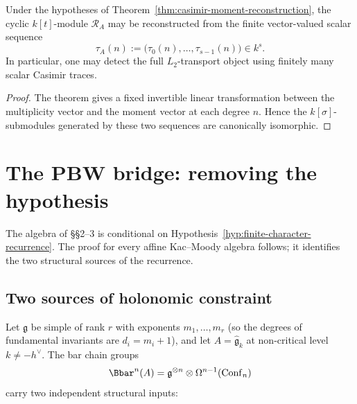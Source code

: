 \begin{corollary}
\ClaimStatusProvedHere
\label{cor:finite-scalar-probes}
Under the hypotheses of Theorem~\ref{thm:casimir-moment-reconstruction}, the cyclic \(k[t]\)-module \(\mathcal R_A\) may be reconstructed from the finite vector-valued scalar sequence
\[
\tau_A(n):=\bigl(\tau_0(n),\dots,\tau_{s-1}(n)\bigr)\in k^s.
\]
In particular, one may detect the full \(L_2\)-transport object using finitely many scalar Casimir traces.
\end{corollary}

\begin{proof}
The theorem gives a fixed invertible linear transformation between the multiplicity vector and the moment vector at each degree \(n\).
Hence the \(k[\sigma]\)-submodules generated by these two sequences are canonically isomorphic.
\end{proof}

\section{The PBW bridge: removing the hypothesis}

The algebra of \S\S2--3 is conditional on
Hypothesis~\ref{hyp:finite-character-recurrence}.
The proof for every affine Kac--Moody algebra follows;
it identifies the two structural sources of the recurrence.

\subsection{Two sources of holonomic constraint}

Let \(\mathfrak g\) be simple of rank \(r\) with exponents
\(m_1,\dots,m_r\) (so the degrees of fundamental invariants are
\(d_i=m_i+1\)), and let \(A=\widehat{\mathfrak g}_k\) at
non-critical level \(k\ne -h^\vee\).
The bar chain groups
\[
\Bbar^n(A)=\mathfrak g^{\otimes n}\otimes
\Omega^{n-1}(\operatorname{Conf}_n)
\]
carry two independent structural inputs:

